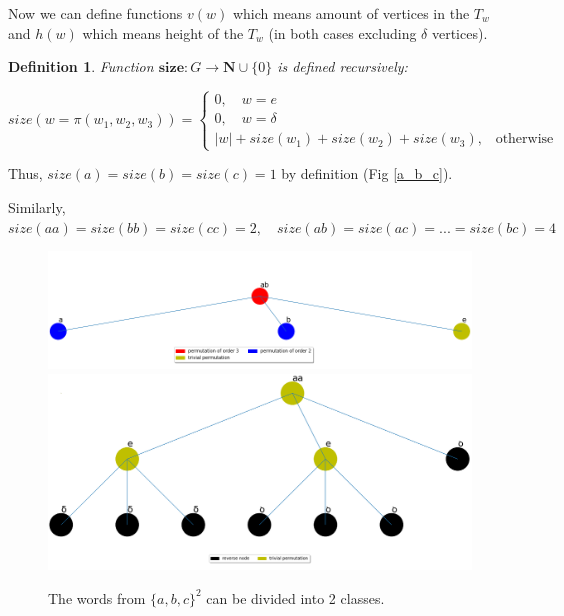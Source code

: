 \documentclass[a4paper,12pt]{amsart}
\newtheorem{definition}{Definition}
\begin{document}
Now we can define functions $v(w)$ which means amount of vertices in the $T_w$ and 
$h(w)$ which means height of the $T_w$ (in both cases excluding $\delta$ vertices).

\theoremstyle{definition}
\begin{definition}
	Function $\textbf{size} : G \rightarrow \mathbf{N} \cup \{0\}$ is defined recursively:
	
	\begin{equation}
	\label{size} 
	size(w = \pi (w_1, w_2, w_3)) =
	\begin{cases}
	0, \quad  w = e \\
	0, \quad  w = \delta  \\
	|w| + size(w_1) + size(w_2) + size(w_3)\text{,} \quad \text{otherwise}
	\end{cases}
	\end{equation}
\end{definition}



Thus, $size(a) = size(b) = size(c) = 1$ by definition (Fig \ref{a_b_c}).

Similarly, $size(aa) = size(bb) = size(cc) = 2, \quad size(ab) = size(ac) = ... = size(bc) = 4$

\begin{figure}[h]
	\centering
	\includegraphics[scale=0.3]{../graphs/ab.png}
	\includegraphics[scale=0.23]{../graphs/aa.png}
	\caption{The words from $\{a, b, c\}^2$ can be divided into 2 classes.}
	\label{second_order}
\end{figure}
\end{document}
